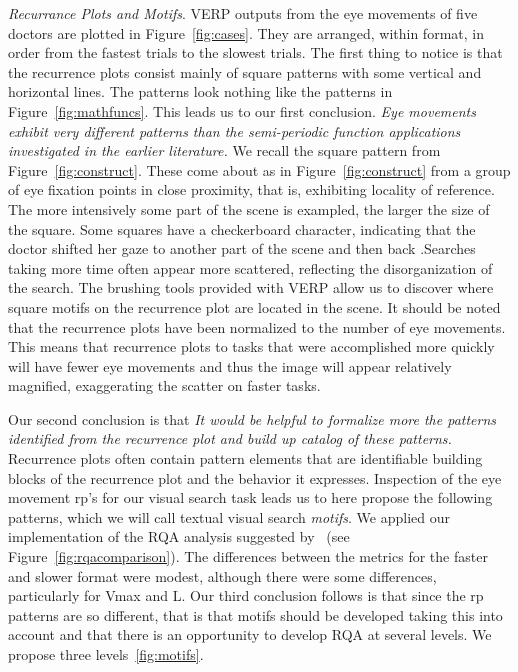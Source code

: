 \documentclass[journal]{vgtc}                %
\begin{document}
\emph{Recurrance Plots and Motifs}. VERP outputs from the eye movements of five doctors are
plotted in Figure~\ref{fig:cases}. They are arranged, within format, in order from the
fastest trials to the slowest trials. The first thing to notice is that the
recurrence plots consist mainly of square patterns with some vertical and horizontal lines. 
The patterns look nothing like the patterns in Figure~\ref{fig:mathfuncs}. This leads us to 
our first conclusion. \emph{Eye movements exhibit very different patterns than the semi-periodic 
function applications investigated in the earlier literature.} We recall the square
pattern from Figure~\ref{fig:construct}. These come about as in Figure~\ref{fig:construct} 
from a group of eye fixation points in close proximity, that is, exhibiting 
locality of reference. The more intensively some part of the scene is exampled, the
larger the size of the square. Some squares have a checkerboard character,
indicating that the doctor shifted her gaze to another part of the scene
and then back .Searches taking more time often  appear more
scattered, reflecting the disorganization of the search. The brushing 
tools provided with VERP allow us to discover where square motifs on 
the recurrence plot are located in the scene. It should be noted that the recurrence 
plots have been normalized to the number of eye movements. This means that recurrence plots
to tasks that were accomplished more quickly will have fewer eye movements
and thus the image will appear relatively magnified, exaggerating the
scatter on faster tasks. 

Our second conclusion is that \emph{It would be helpful to formalize more the patterns identified 
from the recurrence plot and build up catalog of these patterns.}
Recurrence plots often contain
pattern elements that are identifiable building blocks of the recurrence plot and the behavior it expresses. Inspection of the eye movement rp's for our visual search task leads us to here propose the following patterns,  which we will 
call textual visual search  \emph{motifs}. We applied our implementation of the RQA analysis suggested by~\cite{Anderson_2013} (see Figure~\ref{fig:rqacomparison}). The differences between the metrics for the faster and slower format were modest, although there were some differences, particularly for Vmax  and L. Our third conclusion follows is that since the rp patterns are so different, 
that is that motifs should be developed taking this into account and that 
there is an opportunity to develop RQA at several levels. We propose three 
levels~\ref{fig:motifs}.  
\end{document}
